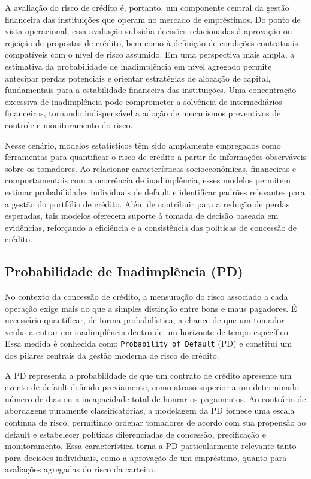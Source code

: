\documentclass[
  brazilian,
  12pt,
  letterpaper,
  DIV=11,
  numbers=noendperiod]{scrartcl}
\begin{document}
A avaliação do risco de crédito é, portanto, um componente central da
gestão financeira das instituições que operam no mercado de empréstimos.
Do ponto de vista operacional, essa avaliação subsidia decisões
relacionadas à aprovação ou rejeição de propostas de crédito, bem como à
definição de condições contratuais compatíveis com o nível de risco
assumido. Em uma perspectiva mais ampla, a estimativa da probabilidade
de inadimplência em nível agregado permite antecipar perdas potenciais e
orientar estratégias de alocação de capital, fundamentais para a
estabilidade financeira das instituições. Uma concentração excessiva de
inadimplência pode comprometer a solvência de intermediários
financeiros, tornando indispensável a adoção de mecanismos preventivos
de controle e monitoramento do risco.

Nesse cenário, modelos estatísticos têm sido amplamente empregados como
ferramentas para quantificar o risco de crédito a partir de informações
observáveis sobre os tomadores. Ao relacionar características
socioeconômicas, financeiras e comportamentais com a ocorrência de
inadimplência, esses modelos permitem estimar probabilidades individuais
de default e identificar padrões relevantes para a gestão do portfólio
de crédito. Além de contribuir para a redução de perdas esperadas, tais
modelos oferecem suporte à tomada de decisão baseada em evidências,
reforçando a eficiência e a consistência das políticas de concessão de
crédito.

\subsection{Probabilidade de Inadimplência
(PD)}\label{probabilidade-de-inadimpluxeancia-pd}

No contexto da concessão de crédito, a mensuração do risco associado a
cada operação exige mais do que a simples distinção entre bons e maus
pagadores. É necessário quantificar, de forma probabilística, a chance
de que um tomador venha a entrar em inadimplência dentro de um horizonte
de tempo específico. Essa medida é conhecida como
\texttt{Probability\ of\ Default} (PD) e constitui um dos pilares
centrais da gestão moderna de risco de crédito.

A PD representa a probabilidade de que um contrato de crédito apresente
um evento de default definido previamente, como atraso superior a um
determinado número de dias ou a incapacidade total de honrar os
pagamentos. Ao contrário de abordagens puramente classificatórias, a
modelagem da PD fornece uma escala contínua de risco, permitindo ordenar
tomadores de acordo com sua propensão ao default e estabelecer políticas
diferenciadas de concessão, precificação e monitoramento. Essa
característica torna a PD particularmente relevante tanto para decisões
individuais, como a aprovação de um empréstimo, quanto para avaliações
agregadas do risco da carteira.
\end{document}
